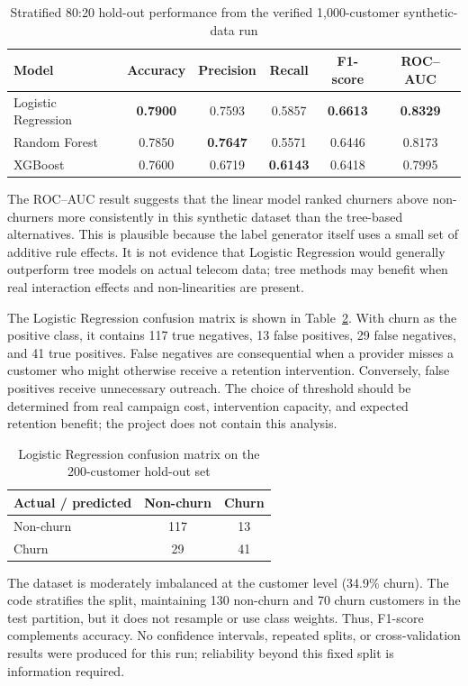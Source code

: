 \documentclass[conference]{IEEEtran}
\begin{document}
\begin{table}[!t]
\caption{Stratified 80:20 hold-out performance from the verified 1,000-customer synthetic-data run}
\label{tab:performance}
\centering
\begin{tabular}{lccccc}
\toprule
Model & Accuracy & Precision & Recall & F1-score & ROC--AUC \\
\midrule
Logistic Regression & \textbf{0.7900} & 0.7593 & 0.5857 & \textbf{0.6613} & \textbf{0.8329} \\
Random Forest & 0.7850 & \textbf{0.7647} & 0.5571 & 0.6446 & 0.8173 \\
XGBoost & 0.7600 & 0.6719 & \textbf{0.6143} & 0.6418 & 0.7995 \\
\bottomrule
\end{tabular}
\end{table}

The ROC--AUC result suggests that the linear model ranked churners above non-churners more consistently in this synthetic dataset than the tree-based alternatives. This is plausible because the label generator itself uses a small set of additive rule effects. It is not evidence that Logistic Regression would generally outperform tree models on actual telecom data; tree methods may benefit when real interaction effects and non-linearities are present.

The Logistic Regression confusion matrix is shown in Table~\ref{tab:cm}. With churn as the positive class, it contains 117 true negatives, 13 false positives, 29 false negatives, and 41 true positives. False negatives are consequential when a provider misses a customer who might otherwise receive a retention intervention. Conversely, false positives receive unnecessary outreach. The choice of threshold should be determined from real campaign cost, intervention capacity, and expected retention benefit; the project does not contain this analysis.

\begin{table}[!t]
\caption{Logistic Regression confusion matrix on the 200-customer hold-out set}
\label{tab:cm}
\centering
\begin{tabular}{lcc}
\toprule
Actual / predicted & Non-churn & Churn \\
\midrule
Non-churn & 117 & 13 \\
Churn & 29 & 41 \\
\bottomrule
\end{tabular}
\end{table}

The dataset is moderately imbalanced at the customer level (34.9\% churn). The code stratifies the split, maintaining 130 non-churn and 70 churn customers in the test partition, but it does not resample or use class weights. Thus, F1-score complements accuracy. No confidence intervals, repeated splits, or cross-validation results were produced for this run; reliability beyond this fixed split is information required.
\end{document}

